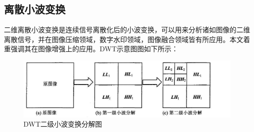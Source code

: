 \documentclass[12pt]{book}
\begin{document}
			\subsection{离散小波变换}二维离散小波变换是连续信号离散化后的小波变换，可以用来分析诸如图像的二维离散信号，并在图像压缩领域，数字水印领域，图像融合领域皆有所应用。本文着重强调其在图像增强上的应用。DWT示意图图如下所示：
				\begin{figure}[!ht]\centering
					\includegraphics[totalheight=40mm,width=160mm]{./figures/DWT.jpg}
					\caption{DWT二级小波变换分解图\label{DWT}}	
				\end{figure}		
\end{document}
